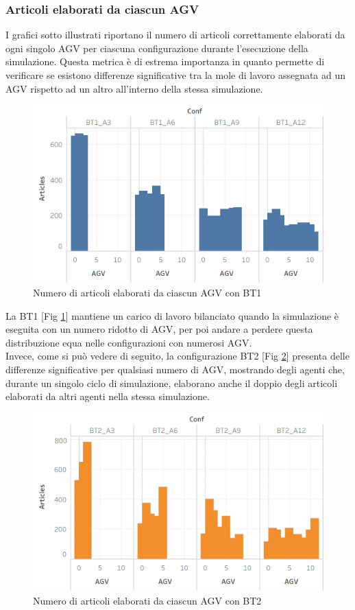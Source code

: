 \documentclass[12pt]{article}
\begin{document}
\subsubsection{Articoli elaborati da ciascun AGV}
\noindent I grafici sotto illustrati riportano il numero di articoli correttamente elaborati da ogni singolo AGV per ciascuna configurazione durante l'esecuzione della simulazione. Questa metrica è di estrema importanza in quanto permette di verificare se esistono differenze significative tra la mole di lavoro assegnata ad un AGV rispetto ad un altro all'interno della stessa simulazione.

\begin{figure}[H]
\centering
  \includegraphics[width=0.8\linewidth]{Figures/Results_Graphics/Articles_BT1.png}
  \caption{Numero di articoli elaborati da ciascun AGV con BT1}\label{fig:articles_agv_bt1}
\end{figure}

\noindent La BT1 [Fig \ref{fig:articles_agv_bt1}] mantiene un carico di lavoro bilanciato quando la simulazione è eseguita con un numero ridotto di AGV, per poi andare a perdere questa distribuzione equa nelle configurazioni con numerosi AGV.\\
\noindent Invece, come si può vedere di seguito, la configurazione BT2 [Fig \ref{fig:articles_agv_bt2}] presenta delle differenze significative per qualsiasi numero di AGV, mostrando degli agenti che, durante un singolo ciclo di simulazione, elaborano anche il doppio degli articoli elaborati da altri agenti nella stessa simulazione.

\begin{figure}[H]
\centering
  \includegraphics[width=0.8\linewidth]{Figures/Results_Graphics/Articles_BT2.png}
  \caption{Numero di articoli elaborati da ciascun AGV con BT2}\label{fig:articles_agv_bt2}
\end{figure}
\end{document}
